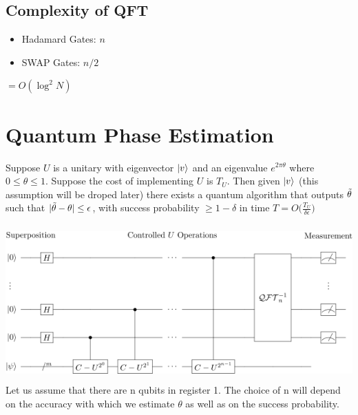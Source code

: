\documentclass[11.5pt, paper=a4]{article}
\theoremstyle{definition}
\numberwithin{theorem}{section}
\begin{document}
\subsection{Complexity of QFT}

\begin{itemize}
    \item Hadamard Gates: $n$
    \item SWAP Gates: $n/2$
    
\end{itemize}

 $= O(\log^2N) $
\section{Quantum Phase Estimation}
Suppose $U$ is a unitary with eigenvector $\ket{v}$ and an eigenvalue $e^{2\pi\theta}$ where $0\leq \theta \le 1$. Suppose the cost of implementing $U$ is $T_U$. Then given $\ket{v}$ (this assumption will be droped later) there exists a quantum algorithm that outputs $\Tilde{\theta}$ such that $|\Tilde{\theta} - \theta| \leq \epsilon$, with success probability  $\geq 1-\delta$ in time $T = O\big(\frac{T_U}{\delta\epsilon}\big)$
\newline

\includegraphics[width=16cm, height=6cm]{images/PhaseCircuit-crop.png}
\vspace{0.5cm}
\\ Let us assume that there are n qubits in register 1. The choice of n will depend on the accuracy with which we estimate $\theta$ as well as on the success probability. 
\end{document}
